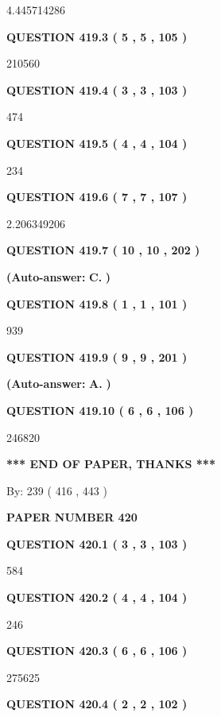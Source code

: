 \documentclass{ctexart}
\begin{document}
4.445714286
  
  
{\textbf{\large{QUESTION
419.3 
 ( 5 , 5 , 105 )
}}}

210560
  
  
{\textbf{\large{QUESTION
419.4 
 ( 3 , 3 , 103 )
}}}

474
  
  
{\textbf{\large{QUESTION
419.5 
 ( 4 , 4 , 104 )
}}}

234
  
  
{\textbf{\large{QUESTION
419.6 
 ( 7 , 7 , 107 )
}}}

2.206349206
  
  
{\textbf{\large{QUESTION
419.7 
 ( 10 , 10 , 202 )
}}}
 
 
{\textbf{(Auto-answer:}}
{\textbf{\large{
C.}}}
{\textbf{)}}
 
 
  
  
{\textbf{\large{QUESTION
419.8 
 ( 1 , 1 , 101 )
}}}

939
  
  
{\textbf{\large{QUESTION
419.9 
 ( 9 , 9 , 201 )
}}}
 
 
{\textbf{(Auto-answer:}}
{\textbf{\large{
A.}}}
{\textbf{)}}
 
 
  
  
{\textbf{\large{QUESTION
419.10 
 ( 6 , 6 , 106 )
}}}

246820
   
   
   
   
\vspace{1.0in} 
{\textbf{\large{ *** END OF PAPER, THANKS *** }}} 
   
   
\hspace{1.0in} By: 
 239 ( 416 ,  443 )
   
   
   
   
\newpage 
\setcounter{page}{ 
   420001 } 
   
   
 {\textbf{ \Large{ PAPER NUMBER  420  }}}
   
   
   
   
  
  
{\textbf{\large{QUESTION
420.1 
 ( 3 , 3 , 103 )
}}}

584
  
  
{\textbf{\large{QUESTION
420.2 
 ( 4 , 4 , 104 )
}}}

246
  
  
{\textbf{\large{QUESTION
420.3 
 ( 6 , 6 , 106 )
}}}

275625
  
  
{\textbf{\large{QUESTION
420.4 
 ( 2 , 2 , 102 )
}}}
\end{document}
